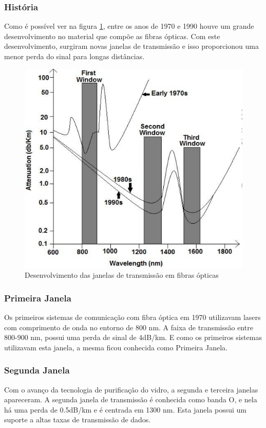 \documentclass[article]{IEEEtran}
\begin{document}
\subsubsection{História}
Como é possível ver na figura \ref{fig:hist-window}, entre os anos de 1970 e 1990 houve um grande desenvolvimento no material que compõe as fibras ópticas. Com este desenvolvimento, surgiram novas janelas de transmissão e isso proporcionou uma menor perda do sinal para longas distâncias.
\begin{figure}[h]
\label{fig:hist-window}
\includegraphics[width=\columnwidth]{hist-windows.png}
\caption{Desenvolvimento das janelas de transmissão em fibras ópticas}
\end{figure}


\subsubsection{Primeira Janela}
Os primeiros sistemas de comunicação com fibra óptica em 1970 utilizavam lasers com comprimento de onda no entorno de 800 nm.
A faixa de transmissão entre 800-900 nm, possui uma perda de sinal de 4dB/km. E como os primeiros sistemas utilizavam esta janela, a mesma ficou conhecida como Primeira Janela.
\subsubsection{Segunda Janela}
Com o avanço da tecnologia de purificação do vidro, a segunda  e terceira janelas apareceram. A segunda janela de transmissão é conhecida como banda O, e nela há uma perda de 0.5dB/km e é centrada em 1300 nm. Esta janela possui um suporte a altas taxas de transmissão de dados.
\end{document}
